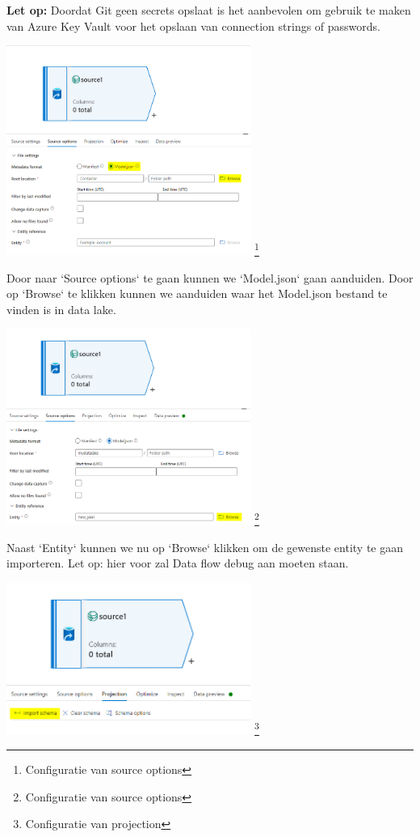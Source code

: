 \textbf{Let op:} Doordat Git geen secrets opslaat is het aanbevolen om gebruik te maken van Azure Key Vault voor het opslaan van connection strings of passwords.

\begin{center}
    \includegraphics[width=0.6\textwidth]{./graphics/adf/source_table_4_specific.png}
    \footnote{Configuratie van source options}
\end{center}

Door naar `Source options` te gaan kunnen we `Model.json` gaan aanduiden. Door op `Browse` te klikken kunnen we aanduiden waar het Model.json bestand te vinden is in data lake.

\begin{center}
    \includegraphics[width=0.6\textwidth]{./graphics/adf/source_table_5_specific.png}
    \footnote{Configuratie van source options}
\end{center}

Naast `Entity` kunnen we nu op `Browse` klikken om de gewenste entity te gaan importeren. Let op: hier voor zal Data flow debug aan moeten staan.

\begin{center}
    \includegraphics[width=0.6\textwidth]{./graphics/adf/source_table_6_specific.png}
    \footnote{Configuratie van projection}
\end{center}

